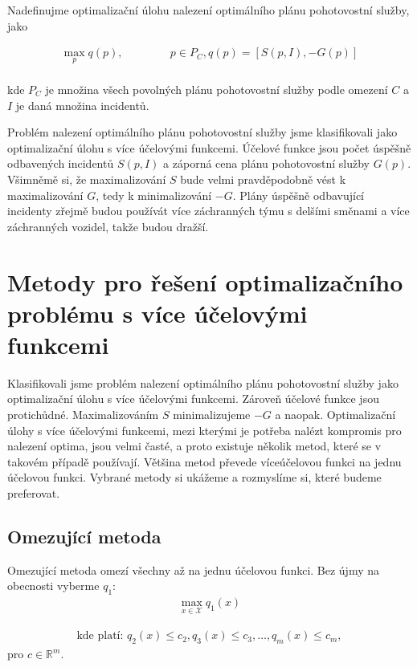 Nadefinujme optimalizační úlohu nalezení optimálního plánu pohotovostní služby, jako
\\
\begin{definice}
  \begin{align}
    \max_{p} q(p), \hspace{50pt} p \in P_C, q(p) = [S(p, I), -G(p)]
  \end{align}
  \\
  kde $P_C$ je množina všech povolných plánu pohotovostní služby podle omezení $C$ a $I$ je daná množina incidentů.
\end{definice}

Problém nalezení optimálního plánu pohotovostní služby jsme klasifikovali jako optimalizační úlohu s více účelovými funkcemi.
Účelové funkce jsou počet úspěšně odbavených incidentů $S(p, I)$ a záporná cena plánu pohotovostní služby $G(p)$.
Všimněmě si, že maximalizování $S$ bude velmi pravděpodobně vést k maximalizování $G$, tedy k minimalizování $-G$.
Plány úspěšně odbavující incidenty zřejmě budou používát více záchranných týmu s delšími směnami a více záchranných vozidel, takže budou dražší.

\section{Metody pro řešení optimalizačního problému s více účelovými funkcemi}

Klasifikovali jsme problém nalezení optimálního plánu pohotovostní služby jako optimalizační úlohu s více účelovými funkcemi.
Zároveň účelové funkce jsou protichůdné. Maximalizováním $S$ minimalizujeme $-G$ a naopak.
Optimalizační úlohy s více účelovými funkcemi, mezi kterými je potřeba nalézt kompromis pro nalezení optima, jsou velmi časté,
a proto existuje několik metod, které se v takovém případě používají.
Většina metod převede víceúčelovou funkci na jednu účelovou funkci.
Vybrané metody si ukážeme a rozmyslíme si, které budeme preferovat. 

\subsection{Omezující metoda}

\begin{definice}
  Omezující metoda omezí všechny až na jednu účelovou funkci. Bez újmy na obecnosti vyberme $q_1$:
  \begin{align*}
    \max_{x \in \mathcal{X}} q_1(x)
  \end{align*}

  \begin{align}
    \text{kde platí: } q_2(x) \leq c_2, q_3(x) \leq c_3, \dots, q_m(x) \leq c_m,
  \end{align}
  pro $c \in \mathbb{R}^m$.
  \\
\end{definice}

